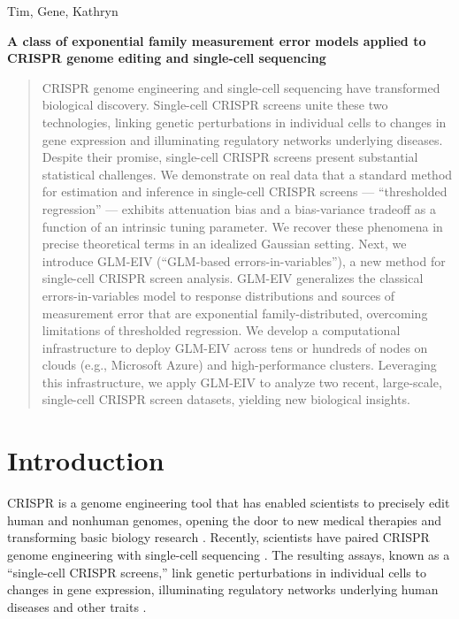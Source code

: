 \documentclass[12pt]{article}
\begin{document}
\noindent
Tim, Gene, Kathryn
\begin{center} 
\textbf{A class of exponential family measurement error models applied to CRISPR genome editing and single-cell sequencing}
\end{center}

\begin{abstract}
CRISPR genome engineering and single-cell sequencing have transformed biological discovery. Single-cell CRISPR screens unite these two technologies, linking genetic perturbations in individual cells to changes in gene expression and illuminating regulatory networks underlying diseases. Despite their promise, single-cell CRISPR screens present substantial statistical challenges. We demonstrate on real data that a standard method for estimation and inference in single-cell CRISPR screens — “thresholded regression” — exhibits attenuation bias and a bias-variance tradeoff as a function of an intrinsic tuning parameter. We recover these phenomena in precise theoretical terms in an idealized Gaussian setting. Next, we introduce GLM-EIV (``GLM-based errors-in-variables''), a new method for single-cell CRISPR screen analysis. GLM-EIV generalizes the classical errors-in-variables model to response distributions and sources of measurement error that are exponential family-distributed, overcoming limitations of thresholded regression. We develop a computational infrastructure to deploy GLM-EIV across tens or hundreds of nodes on clouds (e.g., Microsoft Azure) and high-performance clusters. Leveraging this infrastructure, we apply GLM-EIV to analyze two recent, large-scale, single-cell CRISPR screen datasets, yielding new biological insights.
\end{abstract}
\tableofcontents
\newpage
\section{Introduction}
CRISPR is a genome engineering tool that has enabled scientists to precisely edit human and nonhuman genomes, opening the door to new medical therapies \cite{Rothgangl2021,Musunuru2021} and transforming basic biology research \cite{Przybyla2021}. Recently, scientists have paired CRISPR genome engineering with single-cell sequencing \cite{Dixit2016,Datlinger2017}. The resulting assays, known as a ``single-cell CRISPR screens,'' link genetic perturbations in individual cells to changes in gene expression, illuminating regulatory networks underlying human diseases and other traits \cite{Morris2021a}.
\end{document}
